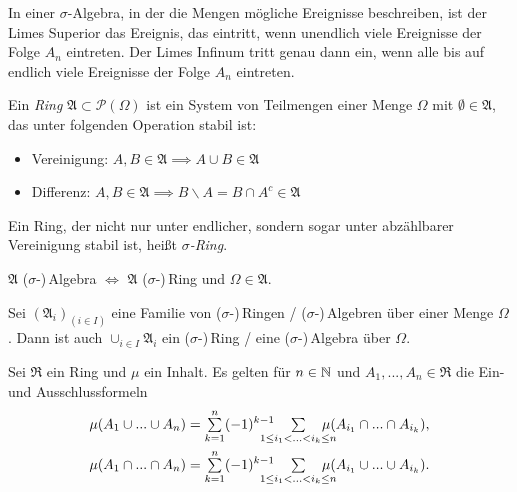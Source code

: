 \documentclass{cheat-sheet}
\newcommand{\Ring}{\mathfrak{R}}
\begin{document}
\begin{bem}
  In einer $\sigma$-Algebra, in der die Mengen mögliche Ereignisse beschreiben, ist der Limes Superior das Ereignis, das eintritt, wenn unendlich viele Ereignisse der Folge $A_n$ eintreten. Der Limes Infinum tritt genau dann ein, wenn alle bis auf endlich viele Ereignisse der Folge $A_n$ eintreten.
\end{bem}

\begin{defn}
  Ein \emph{Ring} $\mathfrak{A} \subset \mathcal{P}(\Omega)$ ist ein System von Teilmengen einer Menge $\Omega$ mit $\emptyset \in \mathfrak{A}$, das unter folgenden Operation stabil ist:

  \begin{itemize}
    \item Vereinigung: $A, B \in \mathfrak{A} \implies A \cup B \in \mathfrak{A}$
    \item Differenz: $A, B \in \mathfrak{A} \implies B \backslash A = B \cap A^c \in \mathfrak{A}$
  \end{itemize}

  Ein Ring, der nicht nur unter endlicher, sondern sogar unter abzählbarer Vereinigung stabil ist, heißt \emph{$\sigma$-Ring}.
\end{defn}

\begin{bem}
  $\mathfrak{A}$ ($\sigma$-)\,Algebra $\iff$ $\mathfrak{A}$ ($\sigma$-)\,Ring und $\Omega \in \mathfrak{A}$.
\end{bem}

\begin{satz}
  Sei $(\mathfrak{A}_i)_{(i \in I)}$ eine Familie von ($\sigma$-)\,Ringen / ($\sigma$-)\,Algebren über einer Menge $\Omega$. Dann ist auch $\cup_{i \in I} \mathfrak{A}_i$ ein ($\sigma$-)\,Ring / eine ($\sigma$-)\,Algebra über $\Omega$.
\end{satz}


\begin{satz}
  Sei $\Ring$ ein Ring und $\mu$ ein Inhalt. Es gelten für $n \in \mathbb{N}$ und $A_1, ..., A_n \in \Ring$ die Ein- und Ausschlussformeln
  \begin{align*}
    \mu(A_1 \cup ... \cup A_n) &= \sum_{k=1}^n (-1)^{k-1} \quad \sum_{\mathclap{1 \leq i_1 < ... < i_k \leq n}} \quad \mu(A_{i_1} \cap ... \cap A_{i_k}), \\
    \mu(A_1 \cap ... \cap A_n) &= \sum_{k=1}^n (-1)^{k-1} \quad \sum_{\mathclap{1 \leq i_1 < ... < i_k \leq n}} \quad \mu(A_{i_1} \cup ... \cup A_{i_k}).
  \end{align*}
\end{satz}
\end{document}
